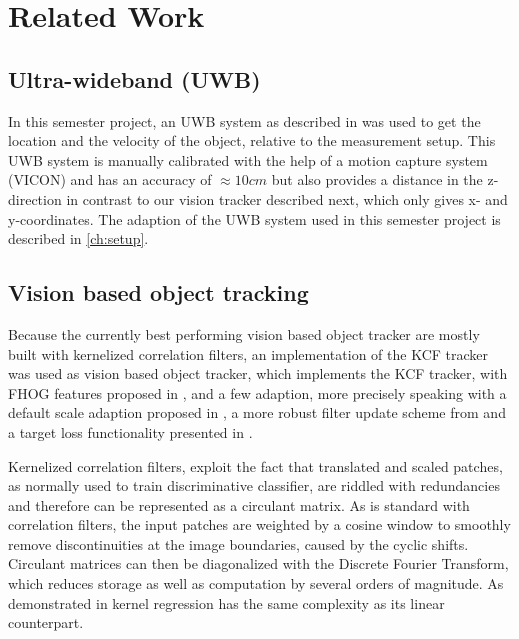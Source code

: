 
\setcounter{chapter}{1}

\chapter{Related Work}

\section{Ultra-wideband (UWB)}
In this semester project, an UWB system as described in \cite{Naegeli:2016} was used to get the location and the velocity of the object, relative to the measurement setup. This UWB system is manually calibrated with the help of a motion capture system (VICON) and has an accuracy of $\approx 10 cm$ but also provides a distance in the z-direction in contrast to our vision tracker described next, which only gives x- and y-coordinates. The adaption of the UWB system used in this semester project is described in \autoref{ch:setup}.

\section{Vision based object tracking}
Because the currently best performing vision based object tracker are mostly built with kernelized correlation filters, an implementation of the KCF tracker \cite{henriques2015tracking} was used as vision based object tracker\cite{Haag:2015}, which implements the KCF tracker, with FHOG features proposed in \cite{lsvm-pami}, and a few adaption, more precisely speaking with a default scale adaption proposed in \cite{danelljan2014dsst}, a more robust filter update scheme from \cite{danelljan2014colorattributes} and a target loss functionality presented in \cite{bolme2010mosse}.

Kernelized correlation filters, exploit the fact that translated and scaled patches, as normally used to train discriminative classifier, are riddled with redundancies and therefore can be represented as a circulant matrix. As is standard with correlation filters, the input patches are weighted by a cosine window to smoothly remove discontinuities at the image boundaries, caused by the cyclic shifts. Circulant matrices can then be diagonalized with the Discrete Fourier Transform, which reduces storage as well as computation by several orders of magnitude. As demonstrated in \cite{henriques2015tracking} kernel regression has the same complexity as its linear counterpart.

